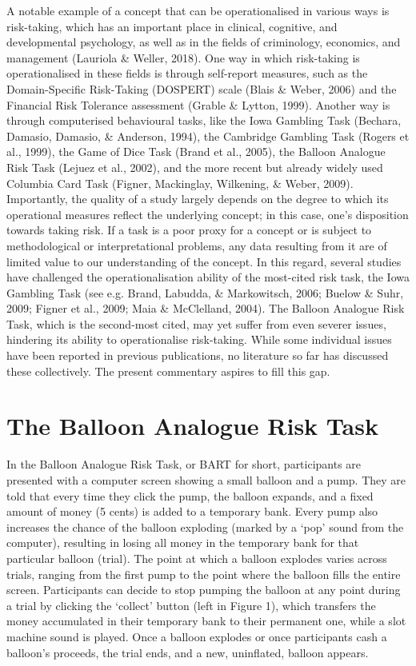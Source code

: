 \documentclass[serif, twocolumn, review]{jote-article}
\begin{document}
A notable example of a concept that can be operationalised in various ways is risk-taking, which has an important place in clinical, cognitive, and developmental psychology, as well as in the fields of criminology, economics, and management (Lauriola \& Weller, 2018). One way in which risk-taking is operationalised in these fields is through self-report measures, such as the Domain-Specific Risk-Taking (DOSPERT) scale (Blais \& Weber, 2006) and the Financial Risk Tolerance assessment (Grable \& Lytton, 1999). Another way is through computerised behavioural tasks, like the Iowa Gambling Task (Bechara, Damasio, Damasio, \& Anderson, 1994), the Cambridge Gambling Task (Rogers et al., 1999), the Game of Dice Task (Brand et al., 2005), the Balloon Analogue Risk Task (Lejuez et al., 2002), and the more recent but already widely used Columbia Card Task (Figner, Mackinglay, Wilkening, \& Weber, 2009). Importantly, the quality of a study largely depends on the degree to which its operational measures reflect the underlying concept; in this case, one's disposition towards taking risk. If a task is a poor proxy for a concept or is subject to methodological or interpretational problems, any data resulting from it are of limited value to our understanding of the concept. In this regard, several studies have challenged the operationalisation ability of the most-cited risk task, the Iowa Gambling Task (see e.g. Brand, Labudda, \& Markowitsch, 2006; Buelow \& Suhr, 2009; Figner et al., 2009; Maia \& McClelland, 2004). The Balloon Analogue Risk Task, which is the second-most cited, may yet suffer from even severer issues, hindering its ability to operationalise risk-taking. While some individual issues have been reported in previous publications, no literature so far has discussed these collectively. The present commentary aspires to fill this gap.

{}
\section*{The Balloon Analogue Risk Task}

 In the Balloon Analogue Risk Task, or BART for short, participants are presented with a computer screen showing a small balloon and a pump. They are told that every time they click the pump, the balloon expands, and a fixed amount of money (5 cents) is added to a temporary bank. Every pump also increases the chance of the balloon exploding (marked by a `pop' sound from the computer), resulting in losing all money in the temporary bank for that particular balloon (trial). The point at which a balloon explodes varies across trials, ranging from the first pump to the point where the balloon fills the entire screen. Participants can decide to stop pumping the balloon at any point during a trial by clicking the `collect' button (left in Figure 1), which transfers the money accumulated in their temporary bank to their permanent one, while a slot machine sound is played. Once a balloon explodes or once participants cash a balloon's proceeds, the trial ends, and a new, uninflated, balloon appears.
\end{document}

